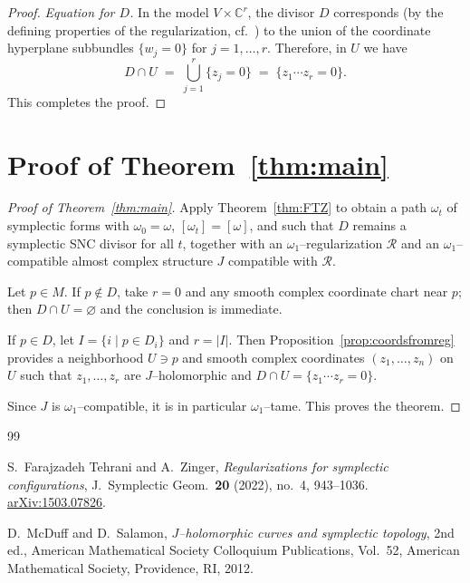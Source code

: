\documentclass[11pt]{article}
\theoremstyle{definition}
\begin{document}
\begin{proof}
\smallskip
\noindent\emph{Equation for $D$.}
In the model $V\times\mathbb C^r$, the divisor $D$ corresponds (by the defining properties of the regularization, cf.\ \cite[Definition~2.1]{FTZ}) to the union of the coordinate hyperplane subbundles $\{w_j=0\}$ for $j=1,\dots,r$.
Therefore, in $U$ we have
\[
D\cap U \;=\; \bigcup_{j=1}^r \{z_j=0\}
\;=\; \{z_1\cdots z_r=0\}.
\]
This completes the proof.
\end{proof}

\section{Proof of Theorem~\ref{thm:main}}

\begin{proof}[Proof of Theorem~\ref{thm:main}]
Apply Theorem~\ref{thm:FTZ} to obtain a path $\omega_t$ of symplectic forms with $\omega_0=\omega$, $[\omega_t]=[\omega]$, and such that $D$ remains a symplectic SNC divisor for all $t$, together with an $\omega_1$--regularization $\mathcal R$ and an $\omega_1$--compatible almost complex structure $J$ compatible with $\mathcal R$.

Let $p\in M$.
If $p\notin D$, take $r=0$ and any smooth complex coordinate chart near $p$; then $D\cap U=\varnothing$ and the conclusion is immediate.

If $p\in D$, let $I=\{i\mid p\in D_i\}$ and $r=|I|$.
Then Proposition~\ref{prop:coordsfromreg} provides a neighborhood $U\ni p$ and smooth complex coordinates $(z_1,\dots,z_n)$ on $U$ such that $z_1,\dots,z_r$ are $J$--holomorphic and $D\cap U=\{z_1\cdots z_r=0\}$.

Since $J$ is $\omega_1$--compatible, it is in particular $\omega_1$--tame.
This proves the theorem.
\end{proof}

\begin{thebibliography}{99}

S.~Farajzadeh Tehrani and A.~Zinger,
\emph{Regularizations for symplectic configurations},
J.\ Symplectic Geom.\ \textbf{20} (2022), no.~4, 943--1036.
\newblock \href{https://arxiv.org/abs/1503.07826}{arXiv:1503.07826}.

D.~McDuff and D.~Salamon,
\emph{$J$--holomorphic curves and symplectic topology},
2nd ed., American Mathematical Society Colloquium Publications, Vol.~52,
American Mathematical Society, Providence, RI, 2012.

\end{thebibliography}
\end{document}
